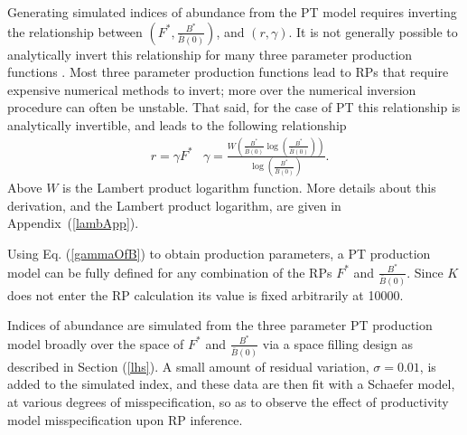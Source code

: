 \documentclass[12pt]{article}
\begin{document}
Generating simulated indices of abundance from the PT model requires
inverting the relationship between $\left(F^*, \frac{B^*}{\bar B(0)}\right)$, and
$(r, \gamma)$. It is not generally possible to analytically invert this
relationship for many three parameter production functions . %
Most three parameter production functions lead to RPs that require expensive 
numerical methods to invert; more over the numerical inversion procedure can %
often be unstable. That said, for the case of PT this relationship is
analytically invertible, and leads to the following relationship
%
\begin{align}
&r = \gamma F^* 
&\gamma = \frac{W\left(\frac{B^*}{\bar B(0)}\log\left(\frac{B^*}{\bar B(0)}\right)\right)}{\log\left(\frac{B^*}{\bar B(0)}\right)}. \label{gammaOfB}
\end{align}
%
Above $W$ is the Lambert product logarithm function. More details about this 
derivation, and the Lambert product logarithm, are given in \mbox{Appendix (\ref{lambApp}).}

%
Using Eq. (\ref{gammaOfB}) to obtain production parameters, a PT production model 
can be fully defined for any combination of the RPs $F^*$ and $\frac{B^*}{\bar B(0)}$.
Since $K$ does not enter the RP calculation its value is fixed arbitrarily at 10000.

%
%


%

Indices of abundance are simulated from the three parameter PT production model
broadly over the space of $F^*$ and $\frac{B^*}{\bar B(0)}$ via a space filling
design as described in Section (\ref{lhs}). A small amount of residual variation, 
$\sigma=0.01$, is added to the simulated index, and these data are then fit with a
Schaefer model, at various degrees of misspecification, so as to observe the 
effect of productivity model misspecification upon RP inference. 
\end{document}
